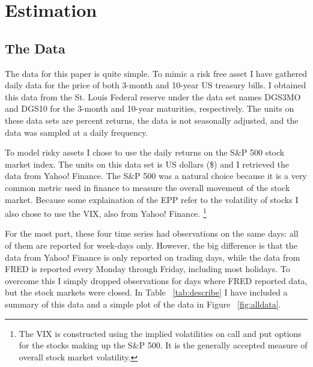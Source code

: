 \documentclass[a4paper, 11pt]{article}
\theoremstyle{definition} %
\numberwithin{equation}{section}
\begin{document}
\section{Estimation} \label{sec:estimation}

  \subsection{The Data} \label{sub:the_data}

    The data for this paper is quite simple. To mimic a risk free asset I have gathered daily data for the price of both 3-month and 10-year US treasury bills. I obtained this data from the St. Louis Federal reserve under the data set names DGS3MO and DGS10 for the 3-month and 10-year maturities, respectively. The units on these data sets are percent returns, the data is not seasonally adjusted, and the data was sampled at a daily frequency.

    To model risky assets I chose to use the daily returns on the S\&P 500 stock market index.  The units on this data set is US dollars (\$) and I retrieved the data from Yahoo! Finance. The S\&P 500 was a natural choice because it is a very common metric used in finance to measure the overall movement of the stock market. Because some explaination of the EPP refer to the volatility of stocks I also chose to use the VIX, also from Yahoo! Finance. \footnote{The VIX is constructed using the implied volatilities on call and put options for the stocks making up the S\&P 500. It is the generally accepted measure of overall stock market volatility.}

    For the most part, these four time series had observations on the same days: all of them are reported for week-days only. However, the big difference is that the data from Yahoo! Finance is only reported on trading days, while the data from FRED is reported every Monday through Friday, including most holidays. To overcome this I simply dropped observations for days where FRED reported data, but the stock markets were closed. In Table ~\ref{tab:describe} I have included a summary of this data and a simple plot of the data in Figure ~\ref{fig:alldata}.
\end{document}
